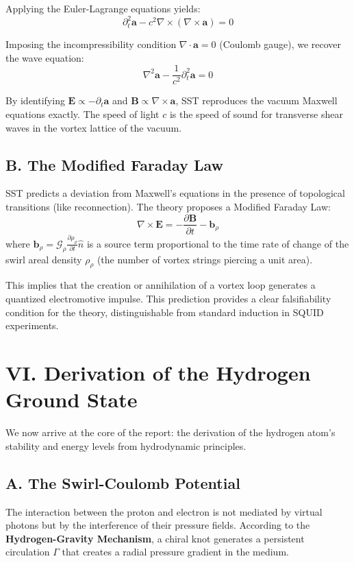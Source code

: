 \documentclass[11pt]{article}
\begin{document}
Applying the Euler-Lagrange equations yields:
\begin{equation}
\partial_t^2 \mathbf{a} - c^2 \nabla \times (\nabla \times \mathbf{a}) = 0
\end{equation}

Imposing the incompressibility condition $\nabla \cdot \mathbf{a} = 0$ (Coulomb gauge), we recover the wave equation:
\begin{equation}
\nabla^2 \mathbf{a} - \frac{1}{c^2} \partial_t^2 \mathbf{a} = 0
\end{equation}

By identifying $\mathbf{E} \propto -\partial_t \mathbf{a}$ and $\mathbf{B} \propto \nabla \times \mathbf{a}$, SST reproduces the vacuum Maxwell equations exactly. The speed of light $c$ is the speed of sound for transverse shear waves in the vortex lattice of the vacuum.

\subsection*{B. The Modified Faraday Law}
SST predicts a deviation from Maxwell's equations in the presence of topological transitions (like reconnection). The theory proposes a Modified Faraday Law:
\begin{equation}
\nabla \times \mathbf{E} = - \frac{\partial \mathbf{B}}{\partial t} - \mathbf{b}_{\rho}
\end{equation}
where $\mathbf{b}_{\rho} = \mathcal{G}_{\rho} \frac{\partial \rho_{\rho}}{\partial t} \hat{n}$ is a source term proportional to the time rate of change of the swirl areal density $\rho_{\rho}$ (the number of vortex strings piercing a unit area).

This implies that the creation or annihilation of a vortex loop generates a quantized electromotive impulse. This prediction provides a clear falsifiability condition for the theory, distinguishable from standard induction in SQUID experiments.

\section*{VI. Derivation of the Hydrogen Ground State}
We now arrive at the core of the report: the derivation of the hydrogen atom's stability and energy levels from hydrodynamic principles.

\subsection*{A. The Swirl-Coulomb Potential}
The interaction between the proton and electron is not mediated by virtual photons but by the interference of their pressure fields. According to the \textbf{Hydrogen-Gravity Mechanism}, a chiral knot generates a persistent circulation $\Gamma$ that creates a radial pressure gradient in the medium.
\end{document}
